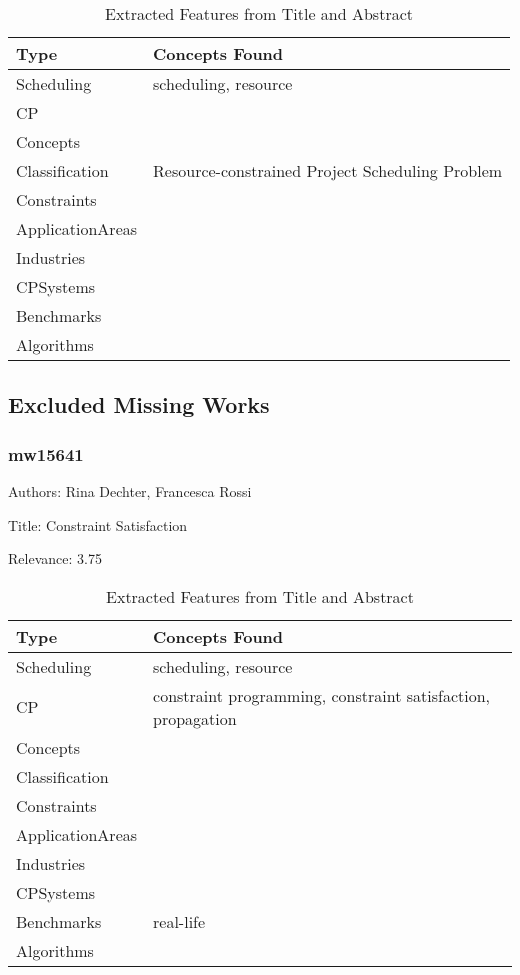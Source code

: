 {\scriptsize
\begin{longtable}{p{2cm}p{20cm}}
\caption{Extracted Features from Title and Abstract}\\ \toprule
Type & Concepts Found\\ \midrule
\endhead
\bottomrule
\endfoot
Scheduling & scheduling, resource\\ 
CP & \\ 
Concepts & \\ 
Classification & Resource-constrained Project Scheduling Problem\\ 
Constraints & \\ 
ApplicationAreas & \\ 
Industries & \\ 
CPSystems & \\ 
Benchmarks & \\ 
Algorithms & \\ 
\end{longtable}
}



\subsection{Excluded Missing Works}

\subsubsection{mw15641}
\label{mw:mw15641}

Authors: Rina Dechter, Francesca Rossi

Title: Constraint Satisfaction

Relevance:  3.75

{\scriptsize
\begin{longtable}{p{2cm}p{20cm}}
\caption{Extracted Features from Title and Abstract}\\ \toprule
Type & Concepts Found\\ \midrule
\endhead
\bottomrule
\endfoot
Scheduling & scheduling, resource\\ 
CP & constraint programming, constraint satisfaction, propagation\\ 
Concepts & \\ 
Classification & \\ 
Constraints & \\ 
ApplicationAreas & \\ 
Industries & \\ 
CPSystems & \\ 
Benchmarks & real-life\\ 
Algorithms & \\ 
\end{longtable}
}

